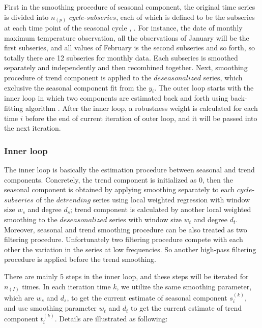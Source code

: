 First in the smoothing procedure of seasonal component, the original time series 
is divided into $n_{(p)}$ $cycle$-$subseries$, each of which is defined to be 
the subseries at each time point of the seasonal cycle \cite{hafen2010local}, 
\cite{Cleveland:1990}. For instance, the date of monthly maximum temperature 
observation, all the observations of January will be the first subseries, and
all values of February is the second subseries and so forth, so totally there are 
12 subseries for monthly data. Each subseries is smoothed separately and 
independently and then recombined together. Next, smoothing procedure of 
trend component is applied to the $deseasonalized$ series, which exclusive the 
seasonal component fit from the $y_i$. The outer loop starts with the inner loop
in which two components are estimated back and forth using back-fitting algorithm 
\cite{breiman1985estimating}. After the inner loop, a robustness weight is 
calculated for each time $i$ before the end of current iteration of outer loop,
and it will be passed into the next iteration.

\subsubsection{Inner loop}

The inner loop is basically the estimation procedure between seasonal and trend
components. Concretely, the trend component is initialized as 0, then the seasonal
component is obtained by applying smoothing separately to each $cycle$-$subseries$ 
of the $detrending$ series using local weighted regression with window size $w_s$ 
and degree $d_s$; trend component is calculated by another local weighted smoothing
to the $deseasonalized$ series with window size $w_t$ and degree $d_t$. Moreover, 
seasonal and trend smoothing procedure can be also treated as two filtering 
procedure. Unfortunately two filtering procedure compete with each other the 
variation in the series at low frequencies. So another high-pass filtering procedure
is applied before the trend smoothing.

There are mainly 5 steps in the inner loop, and these steps will be iterated for
$n_{(I)}$ times. In each iteration time $k$, we utilize the same smoothing parameter,
which are $w_s$ and $d_s$, to get the current estimate of seasonal component 
$s_i^{(k)}$, and use smoothing parameter $w_t$ and $d_t$ to get the current 
estimate of trend component $t_i^{(k)}$. Details are illustrated as following:

